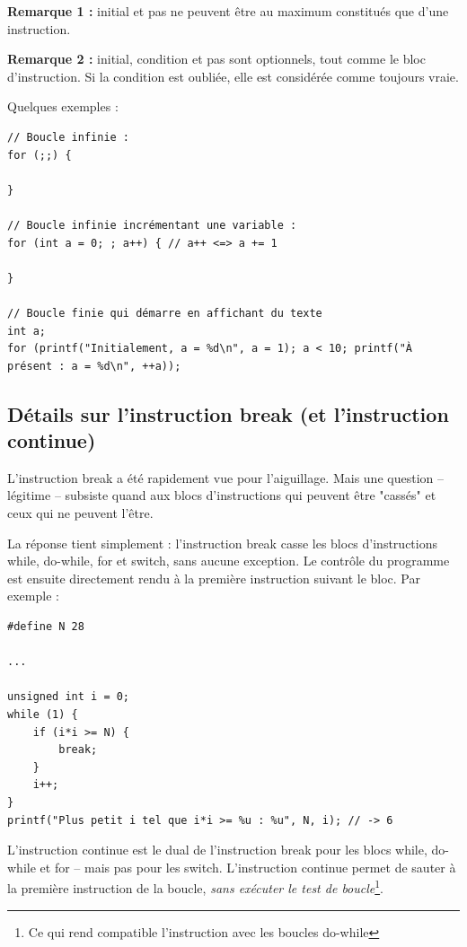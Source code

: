 \documentclass[../../../main.tex]{subfiles}
\begin{document}
\textbf{Remarque 1 :} \textsf{initial} et \textsf{pas} ne peuvent être au maximum constitués que d'une instruction.
 
\textbf{Remarque 2 :} \textsf{initial}, \textsf{condition} et \textsf{pas} sont optionnels, tout comme le bloc d'instruction. Si la condition est oubliée, elle est considérée comme toujours vraie.
 
Quelques exemples :
\begin{verbatim}
// Boucle infinie :
for (;;) {
	
}

// Boucle infinie incrémentant une variable :
for (int a = 0; ; a++) { // a++ <=> a += 1
	
}

// Boucle finie qui démarre en affichant du texte
int a;
for (printf("Initialement, a = %d\n", a = 1); a < 10; printf("À présent : a = %d\n", ++a));
\end{verbatim}

\subsection{Détails sur l'instruction \textbf{break} (et l'instruction \textbf{continue})}
L'instruction \textsf{break} a été rapidement vue pour l'aiguillage. Mais une question -- légitime -- subsiste quand aux blocs d'instructions qui peuvent être "cassés" et ceux qui ne peuvent l'être.

La réponse tient simplement : l'instruction \textsf{break} casse les blocs d'instructions \textsf{while}, \textsf{do-while}, \textsf{for} et \textsf{switch}, sans aucune exception. Le contrôle du programme est ensuite directement rendu à la première instruction suivant le bloc. Par exemple :
\begin{verbatim}
#define N 28

...

unsigned int i = 0;
while (1) {
	if (i*i >= N) {
		break;
	}
	i++;
}
printf("Plus petit i tel que i*i >= %u : %u", N, i); // -> 6
\end{verbatim}

L'instruction \textsf{continue} est le dual de l'instruction \textsf{break} pour les blocs \textsf{while}, \textsf{do-while} et \textsf{for} -- mais pas pour les \textsf{switch}. L'instruction \textsf{continue} permet de sauter à la première instruction de la boucle, \textit{sans exécuter le test de boucle}\footnote{Ce qui rend compatible l'instruction avec les boucles \textsf{do-while}}.
\end{document}
